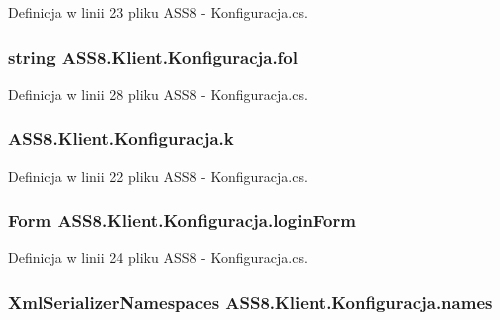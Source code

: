 Definicja w linii 23 pliku ASS8 - Konfiguracja.cs.\hypertarget{a00014_e7c5ada1eda848babdd60e4e8c79b819}{
\subsubsection[{fol}]{\setlength{\rightskip}{0pt plus 5cm}string {\bf ASS8.Klient.Konfiguracja.fol}}}
\label{d2/de7/a00014_e7c5ada1eda848babdd60e4e8c79b819}




Definicja w linii 28 pliku ASS8 - Konfiguracja.cs.\hypertarget{a00014_092fa470ee5f9059cdfda4533edff021}{
\subsubsection[{k}]{ {\bf ASS8.Klient.Konfiguracja.k}}}
\label{d2/de7/a00014_092fa470ee5f9059cdfda4533edff021}




Definicja w linii 22 pliku ASS8 - Konfiguracja.cs.\hypertarget{a00014_59cabf8f3e48082c0ffa5f7da06fc270}{
\subsubsection[{loginForm}]{\setlength{\rightskip}{0pt plus 5cm}Form {\bf ASS8.Klient.Konfiguracja.loginForm}}}
\label{d2/de7/a00014_59cabf8f3e48082c0ffa5f7da06fc270}




Definicja w linii 24 pliku ASS8 - Konfiguracja.cs.\hypertarget{a00014_a9ee3b6dc3dc3b9960e784cd32f1cf60}{
\subsubsection[{names}]{\setlength{\rightskip}{0pt plus 5cm}XmlSerializerNamespaces {\bf ASS8.Klient.Konfiguracja.names}}}
\label{d2/de7/a00014_a9ee3b6dc3dc3b9960e784cd32f1cf60}




